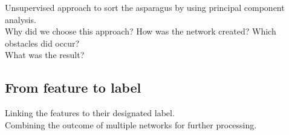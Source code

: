 Unsupervised approach to sort the asparagus by using principal component analysis. \\
Why did we choose this approach? How was the network created? Which obstacles did occur?\\ What was the result?

\subsection{From feature to label}

Linking the features to their designated label. \\
Combining the outcome of multiple networks for further processing.
